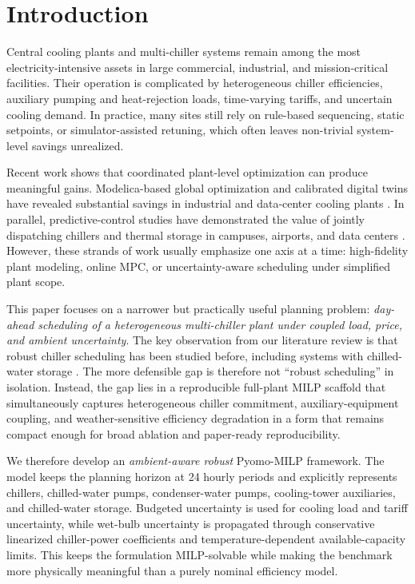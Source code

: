 \section{Introduction}

Central cooling plants and multi-chiller systems remain among the most electricity-intensive assets in large commercial, industrial, and mission-critical facilities. Their operation is complicated by heterogeneous chiller efficiencies, auxiliary pumping and heat-rejection loads, time-varying tariffs, and uncertain cooling demand. In practice, many sites still rely on rule-based sequencing, static setpoints, or simulator-assisted retuning, which often leaves non-trivial system-level savings unrealized.

Recent work shows that coordinated plant-level optimization can produce meaningful gains. Modelica-based global optimization and calibrated digital twins have revealed substantial savings in industrial and data-center cooling plants \citep{niu2023global,bai2024modelica,fu2019equation,kong2025industrial}. In parallel, predictive-control studies have demonstrated the value of jointly dispatching chillers and thermal storage in campuses, airports, and data centers \citep{campos2021dispatch,zhu2023storage,zhao2024mpc,chinde2024airport,lin2025inherent}. However, these strands of work usually emphasize one axis at a time: high-fidelity plant modeling, online MPC, or uncertainty-aware scheduling under simplified plant scope.

This paper focuses on a narrower but practically useful planning problem: \emph{day-ahead scheduling of a heterogeneous multi-chiller plant under coupled load, price, and ambient uncertainty}. The key observation from our literature review is that robust chiller scheduling has been studied before, including systems with chilled-water storage \citep{sadatmohammadi2020robust,saeedi2019robust}. The more defensible gap is therefore not ``robust scheduling'' in isolation. Instead, the gap lies in a reproducible full-plant MILP scaffold that simultaneously captures heterogeneous chiller commitment, auxiliary-equipment coupling, and weather-sensitive efficiency degradation in a form that remains compact enough for broad ablation and paper-ready reproducibility.

We therefore develop an \emph{ambient-aware robust} Pyomo-MILP framework. The model keeps the planning horizon at 24 hourly periods and explicitly represents chillers, chilled-water pumps, condenser-water pumps, cooling-tower auxiliaries, and chilled-water storage. Budgeted uncertainty is used for cooling load and tariff uncertainty, while wet-bulb uncertainty is propagated through conservative linearized chiller-power coefficients and temperature-dependent available-capacity limits. This keeps the formulation MILP-solvable while making the benchmark more physically meaningful than a purely nominal efficiency model.

